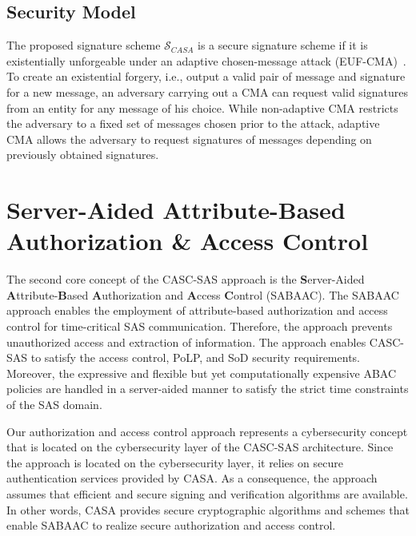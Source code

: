 \subsection{Security Model}
The proposed signature scheme $\mathcal{S}_{CASA}$ is a secure signature scheme if it is existentially unforgeable under an adaptive chosen-message attack (EUF-CMA)~\cite{Boneh2023, Goldwasser1988}.
To create an existential forgery, i.e., output a valid pair of message and signature for a new message, an adversary carrying out a CMA can request valid signatures from an entity for any message of his choice.
While non-adaptive CMA restricts the adversary to a fixed set of messages chosen prior to the attack, adaptive CMA allows the adversary to request signatures of messages depending on previously obtained signatures.

\section{Server-Aided Attribute-Based Authorization \& Access Control}
\label{sec:approach:sabaac}
The second core concept of the CASC-SAS approach is the \textbf{S}erver-Aided \textbf{A}ttribute-\textbf{B}ased \textbf{A}uthorization and \textbf{A}ccess \textbf{C}ontrol (SABAAC).
The SABAAC approach enables the employment of attribute-based authorization and access control for time-critical SAS communication.
Therefore, the approach prevents unauthorized access and extraction of information.
The approach enables CASC-SAS to satisfy the access control, PoLP, and SoD security requirements.
Moreover, the expressive and flexible but yet computationally expensive ABAC policies are handled in a server-aided manner to satisfy the strict time constraints of the SAS domain.

Our authorization and access control approach represents a cybersecurity concept that is located on the cybersecurity layer of the CASC-SAS architecture.
Since the approach is located on the cybersecurity layer, it relies on secure authentication services provided by CASA.
As a consequence, the approach assumes that efficient and secure signing and verification algorithms are available.
In other words, CASA provides secure cryptographic algorithms and schemes that enable SABAAC to realize secure authorization and access control.

